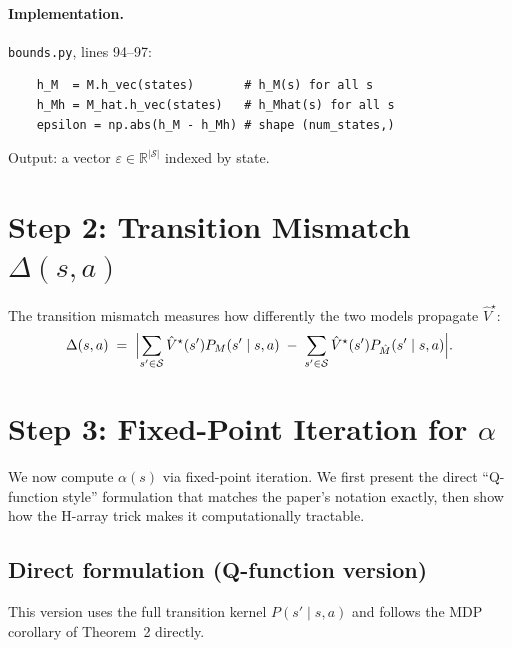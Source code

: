 \documentclass[11pt]{article}
\newcommand{\Vhatstar}{\hat V^\star}
\begin{document}
\paragraph{Implementation.}
\texttt{bounds.py}, lines 94--97:
\begin{verbatim}
    h_M  = M.h_vec(states)       # h_M(s) for all s
    h_Mh = M_hat.h_vec(states)   # h_Mhat(s) for all s
    epsilon = np.abs(h_M - h_Mh) # shape (num_states,)
\end{verbatim}
Output: a vector $\varepsilon \in \mathbb{R}^{|\mathcal{S}|}$ indexed by
state.

\section{Step 2: Transition Mismatch $\Delta(s,a)$}

The transition mismatch measures how differently the two models propagate
$\Vhatstar$:
\begin{equation}\label{eq:delta}
  \Delta(s,a)
  \;=\; \Bigl|\sum_{s' \in \mathcal{S}} \Vhatstar(s')  P_M(s' \mid s, a)
        \;-\; \sum_{s' \in \mathcal{S}} \Vhatstar(s')  P_{\hat M}(s' \mid s, a)\Bigr|.
\end{equation}

\section{Step 3: Fixed-Point Iteration for $\alpha$}

We now compute $\alpha(s)$ via fixed-point iteration.  We first present the
direct ``Q-function style'' formulation that matches the paper's notation
exactly, then show how the H-array trick makes it computationally tractable.

\subsection{Direct formulation (Q-function version)}
\label{sec:q-version}

This version uses the full transition kernel $P(s' \mid s, a)$ and follows
the MDP corollary of Theorem~2 directly.
\end{document}
